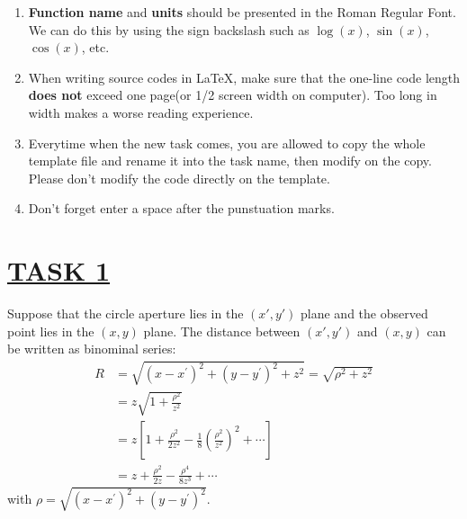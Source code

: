 \documentclass[fontsize=11pt]{scrartcl}
\begin{document}
\begin{enumerate}
    \item  \textbf{Function name} and \textbf{units} should be presented in the Roman Regular Font.
    We can do this by using the sign backslash such as $\log(x)$, $\sin(x)$, $\cos(x)$, etc.
    \item When writing source codes in \LaTeX, make sure that the one-line code length 
    \textbf{does not} exceed one page(or 1/2 screen width on computer). Too long in width makes 
    a worse reading experience.
    \item Everytime when the new task comes, you are allowed to copy the whole template file and 
    rename it into the task name, then modify on the copy. Please don't modify the code directly
    on the template.
    \item Don't forget enter a space after the punstuation marks.
\end{enumerate}



\pagebreak
\section{\uline{TASK 1}}
Suppose that the circle aperture lies in the $(x', y')$ plane and 
the observed point lies in the $(x, y)$ plane. The distance between 
$(x', y')$ and $(x, y)$ can be written as binominal series:
\begin{equation}
    \begin{aligned}
    R &=\sqrt{\left(x-x^{\prime}\right)^{2}+\left(y-y^{\prime}\right)^{2}+z^{2}}=\sqrt{\rho^{2}+z^{2}} \\
    &=z \sqrt{1+\frac{\rho^{2}}{z^{2}}} \\
    &=z\left[1+\frac{\rho^{2}}{2 z^{2}}-\frac{1}{8}\left(\frac{\rho^{2}}{z^{2}}\right)^{2}+\cdots\right] \\
    &=z+\frac{\rho^{2}}{2 z}-\frac{\rho^{4}}{8 z^{3}}+\cdots
    \end{aligned}
\end{equation}
with $\rho=\sqrt{\left(x-x^{\prime}\right)^{2}+\left(y-y^{\prime}\right)^{2}}$.
\end{document}
